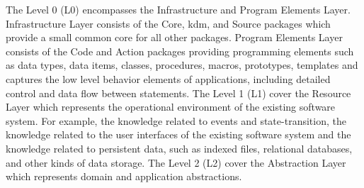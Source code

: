 \documentclass[a4paper,twoside]{article}
\begin{document}
The Level 0 (L0) encompasses the Infrastructure and Program Elements Layer. Infrastructure Layer consists of the Core, kdm, and Source packages which provide a small common core for all other packages. Program Elements Layer consists of the Code and Action packages providing programming elements such as  data types, data items, classes, procedures, macros, prototypes, templates and captures the low level behavior elements of applications, including detailed control and data flow between statements. The Level 1 (L1) cover the Resource Layer which represents the operational environment of the existing software system. For example, the knowledge related to events and state-transition, the knowledge related to the user interfaces of the existing software system and the knowledge related to persistent data, such as indexed files, relational databases, and other kinds of data storage. The Level 2 (L2) cover the Abstraction Layer which represents domain and application abstractions. 



\end{document}
